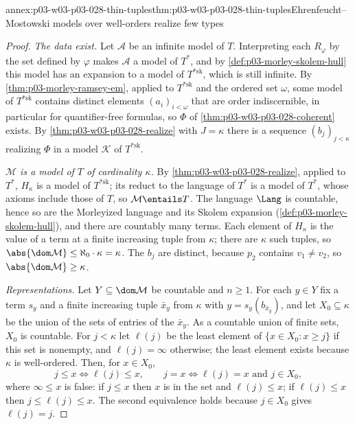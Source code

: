 \begin{annexitem}{annex:p03-w03-p03-028-thin-tuples}{thm:p03-w03-p03-028-thin-tuples}{Ehrenfeucht--Mostowski models over well-orders realize few types}
\begin{proof}
\emph{The data exist.}  Let \(\mathcal A\) be an infinite model of \(T\).
Interpreting each \(R_\varphi\) by the set defined by \(\varphi\) makes
\(\mathcal A\) a model of \(T^*\), and by
\cref{def:p03-morley-skolem-hull} this model has an expansion to a model of
\(T^{*\mathrm{sk}}\), which is still infinite.  By
\cref{thm:p03-morley-ramsey-em}, applied to \(T^{*\mathrm{sk}}\) and the
ordered set \(\omega\), some model of \(T^{*\mathrm{sk}}\) contains
distinct elements \((a_i)_{i<\omega}\) that are order indiscernible, in
particular for quantifier-free formulas, so \(\Phi\) of
\cref{thm:p03-w03-p03-028-coherent} exists.  By
\cref{thm:p03-w03-p03-028-realize} with \(J=\kappa\) there is a sequence
\((b_j)_{j<\kappa}\) realizing \(\Phi\) in a model \(\mathcal K\) of
\(T^{*\mathrm{sk}}\).

\emph{\(\mathcal M\) is a model of \(T\) of cardinality \(\kappa\).}  By
\cref{thm:p03-w03-p03-028-realize}, applied to \(T^*\), \(H_\kappa\) is a
model of \(T^{*\mathrm{sk}}\); its reduct to the language of \(T^*\) is a
model of \(T^*\), whose axioms include those of \(T\), so
\(\mathcal M\entails T\).  The language \(\Lang\) is countable, hence so
are the Morleyized language and its Skolem expansion
(\cref{def:p03-morley-skolem-hull}), and there are countably many terms.
Each element of \(H_\kappa\) is the value of a term at a finite increasing
tuple from \(\kappa\); there are \(\kappa\) such tuples, so
\(\abs{\dom\mathcal M}\leq\aleph_0\cdot\kappa=\kappa\).  The \(b_j\) are
distinct, because \(p_2\) contains \(v_1\neq v_2\), so
\(\abs{\dom\mathcal M}\geq\kappa\).

\emph{Representations.}  Let \(Y\subseteq\dom\mathcal M\) be countable and
\(n\geq1\).  For each \(y\in Y\) fix a term \(s_y\) and a finite increasing
tuple \(\bar x_y\) from \(\kappa\) with \(y=s_y(b_{\bar x_y})\), and let
\(X_0\subseteq\kappa\) be the union of the sets of entries of the
\(\bar x_y\).  As a countable union of finite sets, \(X_0\) is countable.
For \(j<\kappa\) let \(\ell(j)\) be the least element of
\(\{x\in X_0:x\geq j\}\) if this set is nonempty, and \(\ell(j)=\infty\)
otherwise; the least element exists because \(\kappa\) is well-ordered.
Then, for \(x\in X_0\),
\begin{equation*}
 j\leq x\iff \ell(j)\leq x,
 \qquad
 j=x\iff \ell(j)=x\text{ and }j\in X_0,
\end{equation*}
where \(\infty\leq x\) is false: if \(j\leq x\) then \(x\) is in the set and
\(\ell(j)\leq x\); if \(\ell(j)\leq x\) then \(j\leq\ell(j)\leq x\).  The
second equivalence holds because \(j\in X_0\) gives \(\ell(j)=j\).


\end{proof}
\end{annexitem}
